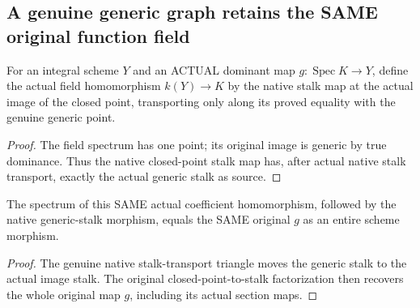 \subsection{A genuine generic graph retains the SAME original function field}

\begin{definition}
\label{scheme:generic-field-point-hom}
\leanok
For an integral scheme $Y$ and an ACTUAL dominant map
$g:\operatorname{Spec}K\to Y$, define the actual field homomorphism
$k(Y)\to K$ by the native stalk map at the actual image of the closed point,
transporting only along its proved equality with the genuine generic point.
\end{definition}
\begin{proof}
The field spectrum has one point; its original image is generic by true
dominance. Thus the native closed-point stalk map has, after actual native
stalk transport, exactly the actual generic stalk as source.
\end{proof}

\begin{theorem}
\label{scheme:generic-field-point-hom-diagram}
\leanok
{}
The spectrum of this SAME actual coefficient homomorphism, followed by the
native generic-stalk morphism, equals the SAME original $g$ as an entire
scheme morphism.
\end{theorem}
\begin{proof}
The genuine native stalk-transport triangle moves the generic stalk to the
actual image stalk. The original closed-point-to-stalk factorization then
recovers the whole original map $g$, including its actual section maps.
\end{proof}

